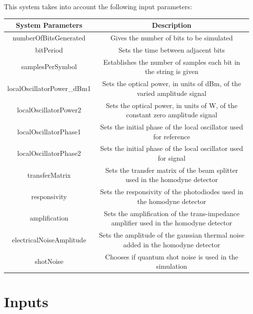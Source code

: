 \documentclass[a4paper]{article}
\begin{document}
This system takes into account the following input parameters:
\begin{table}[H]
\centering
\begin{tabulary}{1.0\textwidth}{|C|C|}
\hline
\textbf{System Parameters} & \textbf{Description}                                                                   \\ \hline
numberOfBitsGenerated      & Gives the number of bits to be simulated                                               \\ \hline  
bitPeriod                  & Sets the time between adjacent bits                                                    \\ \hline 
samplesPerSymbol           & Establishes the number of samples each bit in the string is given                      \\ \hline
localOscillatorPower\_dBm1 & Sets the optical power, in units of dBm, of the varied amplitude signal                \\ \hline  
localOscillatorPower2      & Sets the optical power, in units of W, of the constant zero amplitude signal           \\ \hline  
localOscillatorPhase1      & Sets the initial phase of the local oscillator used for reference                      \\ \hline 
localOscillatorPhase2      & Sets the initial phase of the local oscillator used for signal                         \\ \hline  
transferMatrix             & Sets the transfer matrix of the beam splitter used in the homodyne detector            \\ \hline  
responsivity               & Sets the responsivity of the photodiodes used in the homodyne detector                 \\ \hline  
amplification              & Sets the amplification of the trans-impedance amplifier used in the homodyne detector  \\ \hline  
electricalNoiseAmplitude   & Sets the amplitude of the gaussian thermal noise added in the homodyne detector        \\ \hline
shotNoise                  & Chooses if quantum shot noise is used in the simulation                                \\ \hline
\end{tabulary}
\end{table}		

\section{Inputs}
\end{document}

